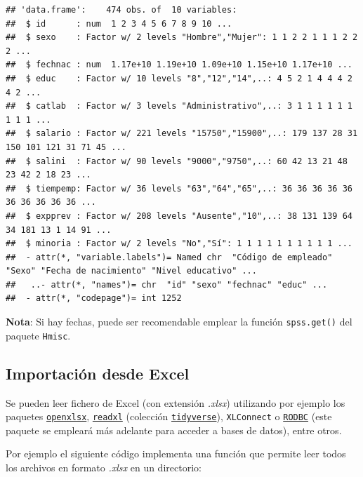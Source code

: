 \documentclass[]{book}
\begin{document}
\begin{verbatim}
## 'data.frame':    474 obs. of  10 variables:
##  $ id      : num  1 2 3 4 5 6 7 8 9 10 ...
##  $ sexo    : Factor w/ 2 levels "Hombre","Mujer": 1 1 2 2 1 1 1 2 2 2 ...
##  $ fechnac : num  1.17e+10 1.19e+10 1.09e+10 1.15e+10 1.17e+10 ...
##  $ educ    : Factor w/ 10 levels "8","12","14",..: 4 5 2 1 4 4 4 2 4 2 ...
##  $ catlab  : Factor w/ 3 levels "Administrativo",..: 3 1 1 1 1 1 1 1 1 1 ...
##  $ salario : Factor w/ 221 levels "15750","15900",..: 179 137 28 31 150 101 121 31 71 45 ...
##  $ salini  : Factor w/ 90 levels "9000","9750",..: 60 42 13 21 48 23 42 2 18 23 ...
##  $ tiempemp: Factor w/ 36 levels "63","64","65",..: 36 36 36 36 36 36 36 36 36 36 ...
##  $ expprev : Factor w/ 208 levels "Ausente","10",..: 38 131 139 64 34 181 13 1 14 91 ...
##  $ minoria : Factor w/ 2 levels "No","Sí": 1 1 1 1 1 1 1 1 1 1 ...
##  - attr(*, "variable.labels")= Named chr  "Código de empleado" "Sexo" "Fecha de nacimiento" "Nivel educativo" ...
##   ..- attr(*, "names")= chr  "id" "sexo" "fechnac" "educ" ...
##  - attr(*, "codepage")= int 1252
\end{verbatim}

\textbf{Nota}: Si hay fechas, puede ser recomendable emplear la función \texttt{spss.get()} del paquete \texttt{Hmisc}.

\hypertarget{importacion-desde-excel}{%
\subsection{Importación desde Excel}\label{importacion-desde-excel}}

Se pueden leer fichero de
Excel (con extensión \emph{.xlsx}) utilizando por ejemplo los paquetes \href{https://cran.r-project.org/web/packages/openxlsx/index.html}{\texttt{openxlsx}}, \href{https://readxl.tidyverse.org}{\texttt{readxl}} (colección \href{https://www.tidyverse.org/}{\texttt{tidyverse}}), \texttt{XLConnect} o
\href{https://cran.r-project.org/web/packages/RODBC/index.html}{\texttt{RODBC}} (este paquete se empleará más adelante para acceder a bases de datos),
entre otros.

Por ejemplo el siguiente código implementa una función que permite leer todos
los archivos en formato \emph{.xlsx} en un directorio:
\end{document}
